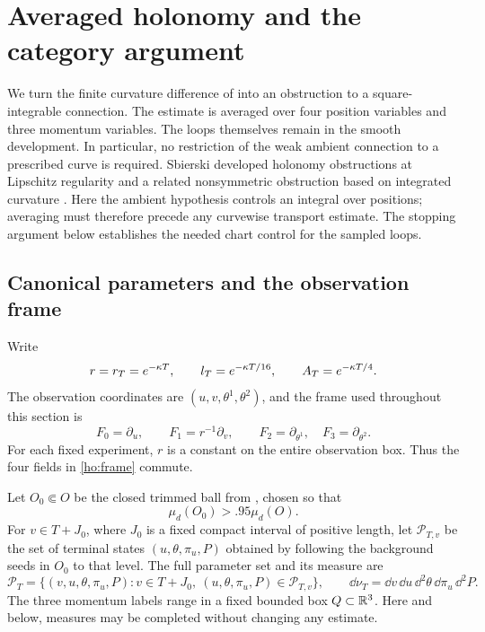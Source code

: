 \section{Averaged holonomy and the category argument}
\label{ho:section}

We turn the finite curvature difference of
 into an obstruction to a square-integrable
connection.  The estimate is averaged over four position variables and
three momentum variables.  The loops themselves remain in the smooth
development.  In particular, no restriction of the weak ambient
connection to a prescribed curve is required.
Sbierski developed holonomy obstructions at Lipschitz regularity
\cite{Sbierski2022} and a related nonsymmetric obstruction based on
integrated curvature \cite{Sbierski2026}. Here the ambient hypothesis controls
an integral over positions; averaging must therefore precede any
curvewise transport estimate. The stopping argument below establishes
the needed chart control for the sampled loops.

\subsection{Canonical parameters and the observation frame}

Write
\begin{equation}\label{ho:scales}
 r=r_T=e^{-\kappa T},\qquad l_T=e^{-\kappa T/16},
 \qquad A_T=e^{-\kappa T/4}.
\end{equation}
The observation coordinates are $(u,v,\theta^1,\theta^2)$, and the frame
used throughout this section is
\begin{equation}\label{ho:frame}
 F_0=\partial_u,\qquad F_1=r^{-1}\partial_v,
 \qquad F_2=\partial_{\theta^1},\quad F_3=\partial_{\theta^2}.
\end{equation}
For each fixed experiment, $r$ is a constant on the entire observation
box.  Thus the four fields in \eqref{ho:frame} commute.

Let $O_0\Subset O$ be the closed trimmed ball from
, chosen so that
\begin{equation}\label{ho:trim}
                   \mu_d(O_0)>.95\mu_d(O).
\end{equation}
For $v\in T+J_0$, where $J_0$ is a fixed compact interval of positive
length, let $\mathcal P_{T,v}$ be the set of terminal states
$(u,\theta,\pi_u,P)$ obtained by following the background seeds in $O_0$
to that level.  The full parameter set and its measure are
\begin{equation}\label{ho:parameter-measure}
 \mathcal P_T=\{(v,u,\theta,\pi_u,P):v\in T+J_0,
                \ (u,\theta,\pi_u,P)\in\mathcal P_{T,v}\},\qquad
 \dd\nu_T=\dd v\,\dd u\,\dd^2\theta\,\dd\pi_u\,\dd^2P.
\end{equation}
The three momentum labels range in a fixed bounded box $Q\subset\mathbb R^3$.
Here and below, measures may be completed without changing any estimate.

